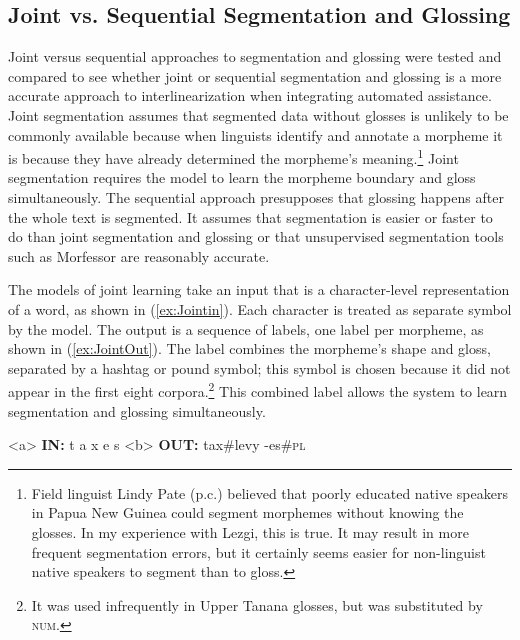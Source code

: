 

\subsection{Joint vs. Sequential Segmentation and Glossing}
\label{sec:sgjoint}

Joint versus sequential approaches to segmentation and glossing were tested and compared to see whether joint or sequential segmentation and glossing is a more accurate approach to interlinearization when integrating automated assistance. Joint segmentation assumes that segmented data without glosses is unlikely to be commonly available because when linguists identify and annotate a morpheme it is because they have already determined the morpheme's meaning.\footnote{Field linguist Lindy Pate (p.c.) believed that poorly educated native speakers in Papua New Guinea could segment morphemes without knowing the glosses. In my experience with Lezgi, this is true. It may result in more frequent segmentation errors, but it certainly seems easier for non-linguist native speakers to segment than to gloss.} 
Joint segmentation requires the model to learn the morpheme boundary and gloss simultaneously. The sequential approach presupposes that glossing happens after the whole text is segmented. It assumes that segmentation is easier or faster to do than joint segmentation and glossing or that unsupervised segmentation tools such as Morfessor \citep{smit-etal-2014-morfessor} are reasonably accurate.

The models of joint learning take an input that is a character-level representation of a word, as shown in (\ref{ex:Jointin}). Each character is treated as separate symbol by the model. The output is a sequence of labels, one label per morpheme, as shown in (\ref{ex:JointOut}). The label combines the morpheme's shape and gloss, separated by a hashtag or pound symbol; this symbol is chosen because it did not appear in the first eight corpora.\footnote{It was used infrequently in Upper Tanana glosses, but was substituted by \textsc{num}.} This combined label allows the system to learn segmentation and glossing simultaneously. 

\pex   
\label{ex:JointInOut}
\a<a> \textbf{IN:} \hspace{6 mm} t \hspace{2 mm} a \hspace{2 mm} x \hspace{2 mm} e \hspace{2 mm} s 
\label{ex:Jointin}
\a<b> \textbf{OUT:} \hspace{2 mm} tax\#levy \hspace{3 mm} -es\#\textsc{pl} 
\label{ex:JointOut}
\xe

